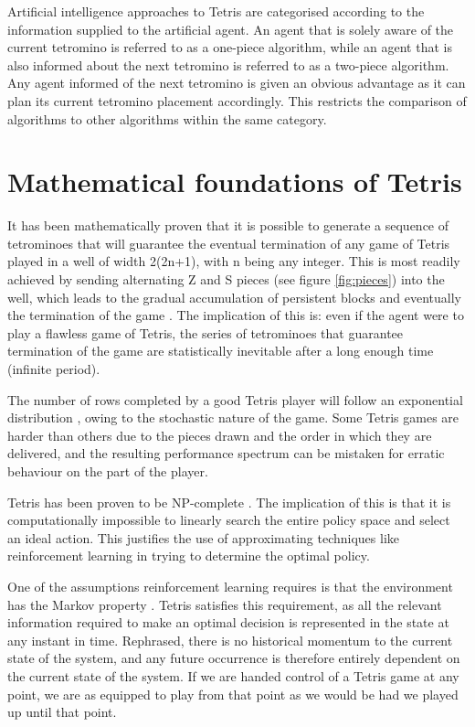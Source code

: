 \documentclass{rucsthesis}
\begin{document}
Artificial intelligence approaches to Tetris are categorised according to the information supplied to the artificial agent. An agent that is solely aware of the current tetromino is referred to as a one-piece algorithm, while an agent that is also informed about the next tetromino is referred to as a two-piece algorithm. Any agent informed of the next tetromino is given an obvious advantage as it can plan its current tetromino placement accordingly. This restricts the comparison of algorithms to other algorithms within the same category.

\section{Mathematical foundations of Tetris}

It has been mathematically proven \citep{mathproof,losetetris} that it is possible to generate a sequence of tetrominoes that will guarantee the eventual termination of any game of Tetris played in a well of width 2(2n+1), with n being any integer. This is most readily achieved by sending alternating Z and S pieces (see figure \ref{fig:pieces}) into the well, which leads to the gradual accumulation of persistent blocks and eventually the termination of the game \citep{mathproof}. The implication of this is: even if the agent were to play a flawless game of Tetris, the series of tetrominoes that guarantee termination of the game are statistically inevitable after a long enough time (infinite period). 

The number of rows completed by a good Tetris player will follow an exponential distribution \citep{tetstand}, owing to the stochastic nature of the game. Some Tetris games are harder than others due to the pieces drawn and the order in which they are delivered, and the resulting performance spectrum can be mistaken for erratic behaviour on the part of the player.

Tetris has been proven to be NP-complete \citep{hardtet}. The implication of this is that it is computationally impossible to linearly search the entire policy space and select an ideal action. This justifies the use of approximating techniques like reinforcement learning in trying to determine the optimal policy.

One of the assumptions reinforcement learning requires is that the environment has the Markov property \citep{suttonbarto}. Tetris satisfies this requirement, as all the relevant information required to make an optimal decision is represented in the state at any instant in time. Rephrased, there is no historical momentum to the current state of the system, and any future occurrence is therefore entirely dependent on the current state of the system. If we are handed control of a Tetris game at any point, we are as equipped to play from that point as we would be had we played up until that point.
\end{document}

